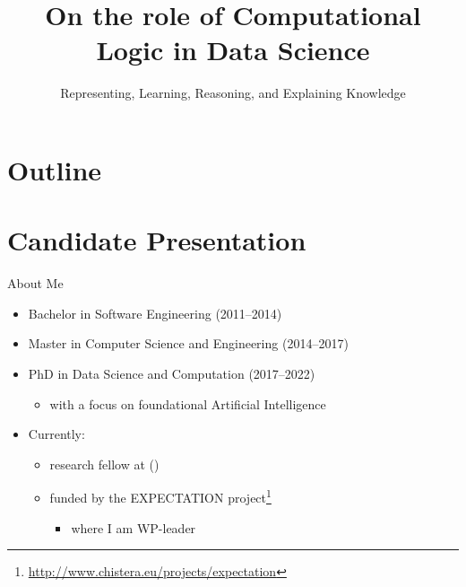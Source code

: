 \documentclass[presentation]{beamer}\mode<presentation>{\usetheme{AMSBolognaFC}}
\title[Role of CL in DS]{On the role of Computational Logic in Data Science}
\subtitle{Representing, Learning, Reasoning, and Explaining Knowledge}
\begin{document}

\frame{\titlepage}

\section*{Outline}
%
\frame[c]{\tableofcontents[hideallsubsections]}

\section{Candidate Presentation}

\begin{frame}{About Me \hfill {}}
    \begin{itemize}
        \item Bachelor in \alert{Software Engineering} (2011--2014)

        \vfill
        
        \item Master in \alert{Computer Science and Engineering} (2014--2017)

        \vfill
        
        \item PhD in \alert{Data Science and Computation} (2017--2022)
        \begin{itemize}
            \item with a focus on foundational \alert{Artificial Intelligence}
        \end{itemize}

        \vfill
        
        \item Currently:
        \begin{itemize}
            \item research fellow at \disiShort{} (\uniboShort{})
            \item funded by the \alert{EXPECTATION} project\footnote{\url{http://www.chistera.eu/projects/expectation}}
            \begin{itemize}
                \item where I am WP-leader
            \end{itemize}
        \end{itemize}
    \end{itemize}
\end{frame}
\end{document}
